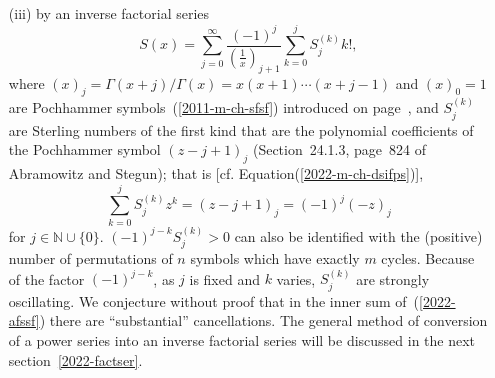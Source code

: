 {\begin{itemize}
\item[(iii)]
by an inverse factorial series~\cite{Weniger2010}
\begin{equation}
S(x)= \sum_{j=0}^\infty \frac{(-1)^j}{\left(\frac{1}{x}\right)_{j+1}} \sum_{k=0}^j {S}_j^{(k)} k!,
\label{2022-afssf}
\end{equation}
where
$\left(x\right)_{j}=\Gamma \left(x+j\right)/\Gamma \left( x \right) = x \left(x +1\right)\cdots \left( x + j - 1 \right)$
and $(x)_0=1$
are Pochhammer symbols~(\ref{2011-m-ch-sfsf}) introduced on page~\pageref{2011-m-ch-sfsf},
and ${S}_j^{(k)}$
are Sterling numbers of the first kind
that are the polynomial coefficients of the
Pochhammer symbol $(z-j+1)_j$
(Section~24.1.3, page~824 of Abramowitz and Stegun\cite[-15mm]{abramowitz:1964:hmf});
that is [cf. Equation(\ref{2022-m-ch-dsifps})],
\begin{equation}
\sum_{k=0}^j {S}_j^{(k)} z^k
= (z-j+1)_j
= (-1)^j  (-z)_j
\label{2022-ch-snfk}
\end{equation}
for $j \in \mathbb{N}\cup \{0\}$.
$(-1)^{j-k}{S}_j^{(k)}>0$
can also be identified with the (positive) number of permutations of $n$ symbols which have exactly $m$ cycles.
Because of the factor $(-1)^{j-k}$, as $j$ is fixed and $k$ varies, ${S}_j^{(k)}$ are strongly oscillating.
We conjecture without proof that in the inner sum of~(\ref{2022-afssf})
there are ``substantial'' cancellations.
The general method of conversion of a power series into an inverse factorial series will be discussed in the next section~\ref{2022-factser}.
\end{itemize}

}
